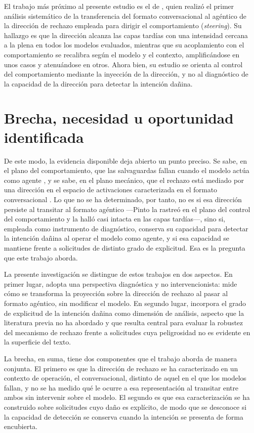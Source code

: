 El trabajo más próximo al presente estudio es el de \textcite{pinto2026}, quien realizó el primer análisis sistemático de la transferencia del formato conversacional al agéntico de la dirección de rechazo empleada para dirigir el comportamiento (\textit{steering}). Su hallazgo es que la dirección alcanza las capas tardías con una intensidad cercana a la plena en todos los modelos evaluados, mientras que su acoplamiento con el comportamiento se recalibra según el modelo y el contexto, amplificándose en unos casos y atenuándose en otros. Ahora bien, su estudio se orienta al control del comportamiento mediante la inyección de la dirección, y no al diagnóstico de la capacidad de la dirección para detectar la intención dañina.

\section{Brecha, necesidad u oportunidad identificada}
\label{sec:brecha}

De este modo, la evidencia disponible deja abierto un punto preciso. Se sabe, en el plano del comportamiento, que las salvaguardas fallan cuando el modelo actúa como agente \parencite{andriushchenko2024}, y se sabe, en el plano mecánico, que el rechazo está mediado por una dirección en el espacio de activaciones caracterizada en el formato conversacional \parencite{arditi2024}. Lo que no se ha determinado, por tanto, no es si esa dirección persiste al transitar al formato agéntico —Pinto la rastreó en el plano del control del comportamiento y la halló casi intacta en las capas tardías—, sino si, empleada como instrumento de diagnóstico, conserva su capacidad para detectar la intención dañina al operar el modelo como agente, y si esa capacidad se mantiene frente a solicitudes de distinto grado de explicitud. Esa es la pregunta que este trabajo aborda.

La presente investigación se distingue de estos trabajos en dos aspectos. En primer lugar, adopta una perspectiva diagnóstica y no intervencionista: mide cómo se transforma la proyección sobre la dirección de rechazo al pasar al formato agéntico, sin modificar el modelo. En segundo lugar, incorpora el grado de explicitud de la intención dañina como dimensión de análisis, aspecto que la literatura previa no ha abordado y que resulta central para evaluar la robustez del mecanismo de rechazo frente a solicitudes cuya peligrosidad no es evidente en la superficie del texto.

La brecha, en suma, tiene dos componentes que el trabajo aborda de manera
conjunta. El primero es que la dirección de rechazo se ha caracterizado en
un contexto de operación, el conversacional, distinto de aquel en el que los
modelos fallan, y no se ha medido qué le ocurre a esa representación al
transitar entre ambos sin intervenir sobre el modelo. El segundo es que esa
caracterización se ha construido sobre solicitudes cuyo daño es explícito,
de modo que se desconoce si la capacidad de detección se conserva cuando la
intención se presenta de forma encubierta.

